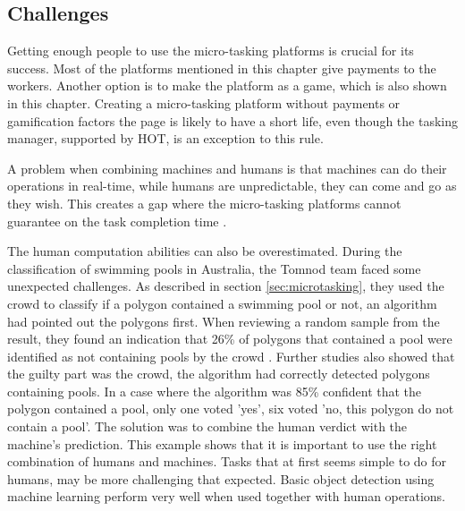 
\subsection{Challenges}
Getting enough people to use the micro-tasking platforms is crucial for its success. Most of the platforms mentioned in this chapter give payments to the workers. Another option is to make the platform as a game, which is also shown in this chapter. Creating a micro-tasking platform without payments or gamification factors the page is likely to have a short life, even though the tasking manager, supported by HOT, is an exception to this rule. 

A problem when combining machines and humans is that machines can do their operations in real-time, while humans are unpredictable, they can come and go as they wish. This creates a gap where the micro-tasking platforms cannot guarantee on the task completion time \citep{Difallah2016}. 

The human computation abilities can also be overestimated. During the classification of swimming pools in Australia, the Tomnod team faced some unexpected challenges. As described in section \ref{sec:microtasking}, they used the crowd to classify if a polygon contained a swimming pool or not, an algorithm had pointed out the polygons first. When reviewing a random sample from the result, they found an indication that 26\% of polygons that contained a pool were identified as not containing pools by the crowd \citep{Kostas2016}.  Further studies also showed that the guilty part was the crowd, the algorithm had correctly detected polygons containing pools. In a case where the algorithm was 85\% confident that the polygon contained a pool, only one voted 'yes', six voted 'no, this polygon do not contain a pool'. The solution was to combine the human verdict with the machine's prediction. This example shows that it is important to use the right combination of humans and machines. Tasks that at first seems simple to do for humans, may be more challenging that expected.  Basic object detection using machine learning perform very well when used together with human operations. 

